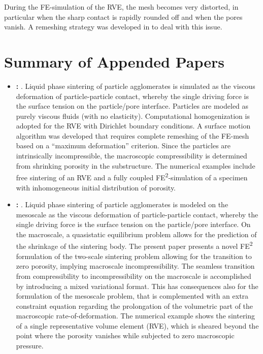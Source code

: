 \documentclass[ExampleMasters.tex]{subfiles}
\begin{document}
During the FE-simulation of the RVE, the mesh becomes very distorted, in particular when the sharp contact is rapidly rounded off and when the pores vanish.
A remeshing strategy was developed in  to deal with this issue.


\chapter{Summary of Appended Papers}
\begin{itemize}
 \item \textbf{: }.
Liquid phase sintering of particle agglomerates is simulated as the viscous deformation of particle-particle contact, whereby the single driving force is the surface tension on the particle/pore interface.
Particles are modeled as purely viscous fluids (with no elasticity). 
Computational homogenization is adopted for the RVE with Dirichlet boundary conditions.
A surface motion algorithm was developed that requires complete remeshing of the FE-mesh based on a ``maximum deformation'' criterion. 
Since the particles are intrinsically incompressible, the macroscopic compressibility is determined from shrinking porosity in the substructure.
The numerical examples include free sintering of an RVE and a fully coupled FE\textsuperscript{2}-simulation of a specimen with inhomogeneous initial distribution of porosity.

 \item \textbf{: }.
Liquid phase sintering of particle agglomerates is modeled on the mesoscale as the viscous deformation of particle-particle contact, whereby the single driving force is the surface tension on the particle/pore interface.
On the macroscale, a quasistatic equilibrium problem allows for the prediction of the shrinkage of the sintering body. 
The present paper presents a novel FE\textsuperscript{2} formulation of the two-scale sintering problem allowing for the transition to zero porosity, implying macroscale incompressibility.
The seamless transition from compressibility to incompressibility on the macroscale is accomplished by introducing a mixed variational format.
This has consequences also for the formulation of the mesoscale problem, that is complemented with an extra constraint equation regarding the prolongation of the volumetric part of the macroscopic rate-of-deformation.
The numerical example shows the sintering of a single representative volume element (RVE), which is sheared beyond the point where the porosity vanishes while subjected to zero macroscopic pressure.

\end{itemize}
\end{document}

